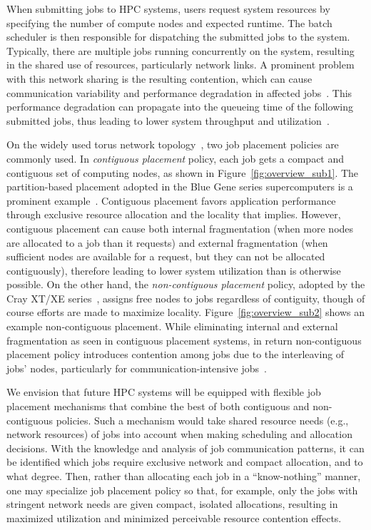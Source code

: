 When submitting jobs to HPC systems, 
users request system resources by specifying the number of compute nodes and expected runtime. 
The batch scheduler is then responsible for dispatching the submitted jobs to the system. 
Typically, there are multiple jobs running concurrently on the system,
resulting in the shared use of resources, particularly network links. 
A prominent problem with this network sharing is the resulting contention,
which can cause communication variability and 
performance degradation in affected jobs~\cite{abhinav-sc13}. 
This performance degradation can propagate into the queueing time of the following submitted jobs, 
thus leading to lower system throughput and utilization~\cite{jose-ipdps15}. 

On the widely used torus network topology~\cite{bgq,tofu,titan}, 
two job placement policies are commonly used. 
In \emph{contiguous placement} policy, 
each job gets a compact and contiguous set of computing nodes, 
as shown in Figure~\ref{fig:overview_sub1}. 
The partition-based placement adopted in the Blue Gene 
series supercomputers is a prominent example~\cite{bgloverview}. 
Contiguous placement favors application performance 
through exclusive resource allocation and the locality that implies. 
However, contiguous placement can cause both internal fragmentation 
(when more nodes are allocated to a job than it requests) 
and external fragmentation 
(when sufficient nodes are available for a request, but they can not be allocated contiguously), 
therefore leading to lower system utilization than is otherwise possible. 
On the other hand, the \emph{non-contiguous placement} policy, 
adopted by the Cray XT/XE series~\cite{carl-cug}, 
assigns free nodes to jobs regardless of contiguity, 
though of course efforts are made to maximize locality. 
Figure~\ref{fig:overview_sub2} shows an example non-contiguous placement. 
While eliminating internal and external fragmentation as seen in contiguous placement systems, 
in return non-contiguous placement policy introduces contention among jobs due to the interleaving of jobs' nodes, 
particularly for communication-intensive jobs~\cite{abhinav-sc13}.

We envision that future HPC systems will be equipped with 
flexible job placement mechanisms that combine the 
best of both contiguous and non-contiguous policies. 
Such a mechanism would take 
shared resource needs (e.g., network resources) of jobs into account 
when making scheduling and allocation decisions. 
With the knowledge and analysis of job communication patterns, 
it can be identified which jobs require exclusive network and compact allocation, and to what degree. 
Then, rather than allocating each job in a ``know-nothing'' manner, 
one may specialize job placement policy so that, for example, 
only the jobs with stringent network needs are given compact, isolated allocations, 
resulting in maximized utilization and minimized perceivable resource contention effects.

